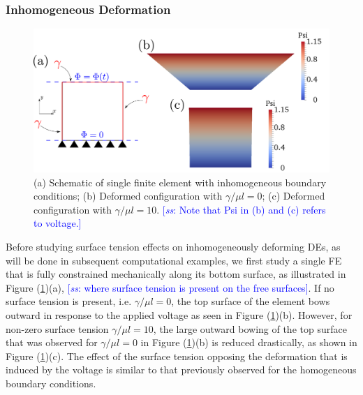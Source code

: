 \documentclass[final,authoryear,3p,times]{elsarticle}
\newcommand{\hsp}[1]{\textcolor{blue}{[\textit{ss}: #1]}}
\begin{document}
\subsubsection{Inhomogeneous Deformation}

\begin{figure} \begin{center} 
\includegraphics[scale=0.25]{pics/inhomo3.pdf}
\caption{(a) Schematic of single finite element with inhomogeneous boundary conditions; (b) Deformed configuration with $\gamma/\mu l=0$; (c) Deformed configuration with $\gamma/\mu l=10$.  \hsp{Note that Psi in (b) and (c) refers to voltage.}}  
\label{inhomo3} \end{center} \end{figure}


Before studying surface tension effects on inhomogeneously deforming DEs, as will be done in subsequent computational examples, we first study a single FE that is fully constrained mechanically along its bottom surface, as illustrated in Figure (\ref{inhomo3})(a), \hsp{where surface tension is present on the free surfaces}.  If no surface tension is present, i.e. $\gamma/\mu l=0$, the top surface of the element bows outward in response to the applied voltage as seen in Figure (\ref{inhomo3})(b).  However, for non-zero surface tension $\gamma/\mu l=10$, the large outward bowing of the top surface that was observed for $\gamma/\mu l=0$ in Figure (\ref{inhomo3})(b) is reduced drastically, as shown in Figure (\ref{inhomo3})(c).  The effect of the surface tension opposing the deformation that is induced by the voltage is similar to that previously observed for the homogeneous boundary conditions.

\end{document}
